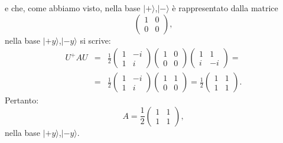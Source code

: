 \documentclass[a4paper,12pt,oneside]{book}
\begin{document}
e che, come abbiamo visto, nella base $| + \rangle $,$| - \rangle $ è rappresentato dalla matrice
	\begin{equation}
		\begin{pmatrix}
		1 & 0\\
		0 & 0
		\end{pmatrix} ,
	\end{equation}
nella base $| +y \rangle $,$| -y \rangle$ si scrive:
	\begin{eqnarray}
		U^+AU &=& \frac{1}{2}
		\begin{pmatrix}
		1 & -i\\
		1 & i
		\end{pmatrix}
		\begin{pmatrix}
		1 & 0\\
		0 & 0
		\end{pmatrix}
		\begin{pmatrix}
		1 & 1\\
		i & -i
		\end{pmatrix}= \nonumber \\
		&=&\frac{1}{2}
		\begin{pmatrix}
		1 & -i\\
		1 & i
		\end{pmatrix}
		\begin{pmatrix}
		1 & 1\\
		0 & 0
		\end{pmatrix}=
		\frac{1}{2}
		\begin{pmatrix}
		1 & 1\\
		1 & 1
		\end{pmatrix} .
		\end{eqnarray}
Pertanto:
	\begin{equation}
		\boxed{
			A= \frac{1}{2}
			\begin{pmatrix}
			1 & 1\\
			1 & 1
			\end{pmatrix} ,
			}
	\end{equation}
nella base $| +y \rangle $,$| -y \rangle $.\\
\end{document}
